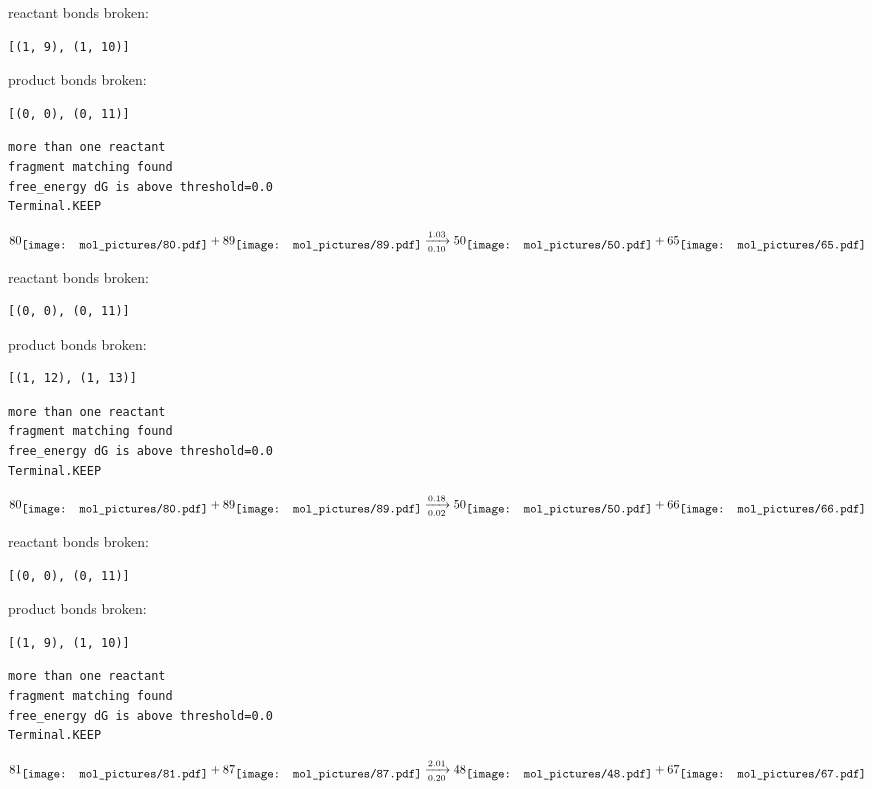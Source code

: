 \documentclass{article}
\begin{document}
reactant bonds broken:\begin{verbatim}
[(1, 9), (1, 10)]
\end{verbatim}
product bonds broken:\begin{verbatim}
[(0, 0), (0, 11)]
\end{verbatim}




\vspace{1cm}
\begin{verbatim}
more than one reactant
fragment matching found
free_energy dG is above threshold=0.0
Terminal.KEEP
\end{verbatim}
$$
80
\raisebox{-.5\height}{\texttt{[image: mol\_pictures/80.pdf]}}
+
89
\raisebox{-.5\height}{\texttt{[image: mol\_pictures/89.pdf]}}
\xrightarrow[0.10]{1.03}
50
\raisebox{-.5\height}{\texttt{[image: mol\_pictures/50.pdf]}}
+
65
\raisebox{-.5\height}{\texttt{[image: mol\_pictures/65.pdf]}}
$$


reactant bonds broken:\begin{verbatim}
[(0, 0), (0, 11)]
\end{verbatim}
product bonds broken:\begin{verbatim}
[(1, 12), (1, 13)]
\end{verbatim}




\vspace{1cm}
\begin{verbatim}
more than one reactant
fragment matching found
free_energy dG is above threshold=0.0
Terminal.KEEP
\end{verbatim}
$$
80
\raisebox{-.5\height}{\texttt{[image: mol\_pictures/80.pdf]}}
+
89
\raisebox{-.5\height}{\texttt{[image: mol\_pictures/89.pdf]}}
\xrightarrow[0.02]{0.18}
50
\raisebox{-.5\height}{\texttt{[image: mol\_pictures/50.pdf]}}
+
66
\raisebox{-.5\height}{\texttt{[image: mol\_pictures/66.pdf]}}
$$


reactant bonds broken:\begin{verbatim}
[(0, 0), (0, 11)]
\end{verbatim}
product bonds broken:\begin{verbatim}
[(1, 9), (1, 10)]
\end{verbatim}




\vspace{1cm}
\begin{verbatim}
more than one reactant
fragment matching found
free_energy dG is above threshold=0.0
Terminal.KEEP
\end{verbatim}
$$
81
\raisebox{-.5\height}{\texttt{[image: mol\_pictures/81.pdf]}}
+
87
\raisebox{-.5\height}{\texttt{[image: mol\_pictures/87.pdf]}}
\xrightarrow[0.20]{2.01}
48
\raisebox{-.5\height}{\texttt{[image: mol\_pictures/48.pdf]}}
+
67
\raisebox{-.5\height}{\texttt{[image: mol\_pictures/67.pdf]}}
$$
\end{document}
